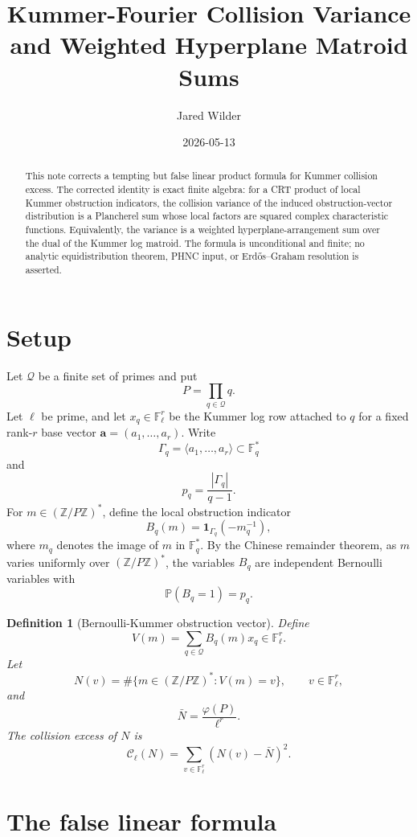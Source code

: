 \documentclass[11pt]{article}
\title{Kummer-Fourier Collision Variance and Weighted Hyperplane Matroid Sums}
\author{Jared Wilder}
\date{2026-05-13}
\newtheorem{definition}{Definition}
\newcommand{\Z}{\mathbb Z}
\newcommand{\F}{\mathbb F}
\newcommand{\one}{\mathbf 1}
\begin{document}
\maketitle

\begin{abstract}
This note corrects a tempting but false linear product formula for Kummer collision excess.  The corrected identity is exact finite algebra: for a CRT product of local Kummer obstruction indicators, the collision variance of the induced obstruction-vector distribution is a Plancherel sum whose local factors are squared complex characteristic functions.  Equivalently, the variance is a weighted hyperplane-arrangement sum over the dual of the Kummer log matroid.  The formula is unconditional and finite; no analytic equidistribution theorem, PHNC input, or Erd\H{o}s--Graham resolution is asserted.
\end{abstract}

\section{Setup}

Let \(\mathcal Q\) be a finite set of primes and put
\[
P=\prod_{q\in\mathcal Q}q.
\]
Let \(\ell\) be prime, and let \(x_q\in\F_\ell^r\) be the Kummer log row attached to \(q\) for a fixed rank-\(r\) base vector \(\mathbf a=(a_1,\ldots,a_r)\).  Write
\[
\Gamma_q=\langle a_1,\ldots,a_r\rangle\subset\F_q^*
\]
and
\[
p_q=\frac{|\Gamma_q|}{q-1}.
\]
For \(m\in(\Z/P\Z)^*\), define the local obstruction indicator
\[
B_q(m)=\one_{\Gamma_q}(-m_q^{-1}),
\]
where \(m_q\) denotes the image of \(m\) in \(\F_q^*\).  By the Chinese remainder theorem, as \(m\) varies uniformly over \((\Z/P\Z)^*\), the variables \(B_q\) are independent Bernoulli variables with
\[
\mathbb P(B_q=1)=p_q.
\]

\begin{definition}[Bernoulli-Kummer obstruction vector]
Define
\[
V(m)=\sum_{q\in\mathcal Q} B_q(m)x_q\in\F_\ell^r.
\]
Let
\[
N(v)=\#\{m\in(\Z/P\Z)^*:V(m)=v\},
\qquad v\in\F_\ell^r,
\]
and
\[
\bar N=\frac{\varphi(P)}{\ell^r}.
\]
The collision excess of \(N\) is
\[
\mathcal C_\ell(N)=\sum_{v\in\F_\ell^r}(N(v)-\bar N)^2.
\]
\end{definition}

\section{The false linear formula}
\end{document}

